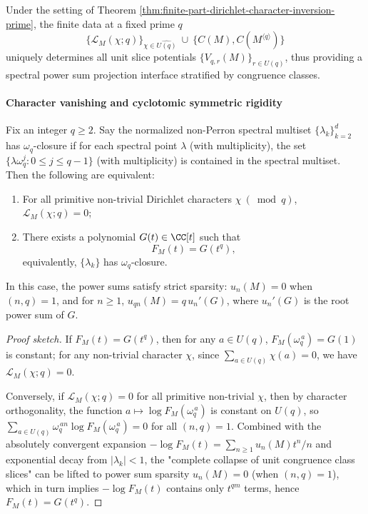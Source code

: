 \begin{corollary}\label{cor:finite-part-dirichlet-character-single-layer-complete-prime}
Under the setting of Theorem \ref{thm:finite-part-dirichlet-character-inversion-prime},
the finite data at a fixed prime \(q\)
\[
\bigl\{\mathcal{L}_M(\chi;q)\bigr\}_{\chi\in\widehat{U(q)}}\ \cup\ \{C(M),C(M^{\langle q\rangle})\}
\]
uniquely determines all unit slice potentials \(\{V_{q,r}(M)\}_{r\in U(q)}\), thus providing a spectral power sum projection interface stratified by congruence classes.
\end{corollary}

\paragraph{Character vanishing and cyclotomic symmetric rigidity}
\begin{theorem}\label{thm:finite-part-dirichlet-vanishing-cyclotomic-symmetry}
Fix an integer \(q\ge2\).
Say the normalized non-Perron spectral multiset \(\{\lambda_k\}_{k=2}^d\) has \(\omega_q\)-closure if for each spectral point \(\lambda\) (with multiplicity), the set
\(\{\lambda\omega_q^j:0\le j\le q-1\}\) (with multiplicity) is contained in the spectral multiset.
Then the following are equivalent:
\begin{enumerate}
  \item For all primitive non-trivial Dirichlet characters \(\chi\ (\bmod q)\), \(\mathcal{L}_M(\chi;q)=0\);
  \item There exists a polynomial \(G(t)\in\CC[t]\) such that
  \[
  F_M(t)=G(t^q),
  \]
  equivalently, \(\{\lambda_k\}\) has \(\omega_q\)-closure.
\end{enumerate}
In this case, the power sums satisfy strict sparsity:
\(u_n(M)=0\) when \((n,q)=1\), and for \(n\ge1\), \(u_{qn}(M)=q\,u_n'(G)\), where \(u_n'(G)\) is the root power sum of \(G\).
\end{theorem}
\begin{proof}[Proof sketch]
If \(F_M(t)=G(t^q)\), then for any \(a\in U(q)\), \(F_M(\omega_q^{\,a})=G(1)\) is constant;
for any non-trivial character \(\chi\), since \(\sum_{a\in U(q)}\chi(a)=0\), we have \(\mathcal{L}_M(\chi;q)=0\).
\par
Conversely, if \(\mathcal{L}_M(\chi;q)=0\) for all primitive non-trivial \(\chi\), then by character orthogonality, the function
\(a\mapsto \log F_M(\omega_q^{\,a})\) is constant on \(U(q)\), so
\(\sum_{a\in U(q)}\omega_q^{\,an}\log F_M(\omega_q^{\,a})=0\) for all \((n,q)=1\).
Combined with the absolutely convergent expansion
\(
-\log F_M(t)=\sum_{n\ge1}u_n(M)t^n/n
\)
and exponential decay from \(|\lambda_k|<1\),
the "complete collapse of unit congruence class slices" can be lifted to power sum sparsity \(u_n(M)=0\) (when \((n,q)=1\)),
which in turn implies \(-\log F_M(t)\) contains only \(t^{qm}\) terms, hence \(F_M(t)=G(t^q)\).
\end{proof}

